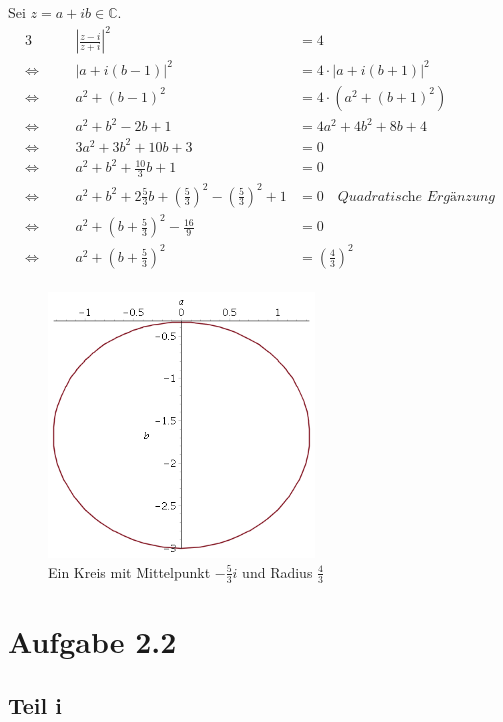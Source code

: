 \documentclass[10pt,a4paper]{article}
\begin{document}
Sei $z = a + ib \in \mathbb{C}$.
\begin{alignat*}{3}
&& \left| \frac{z - i}{z + i} \right|^{2} & = 4\\
\Leftrightarrow \quad && \left| a + i(b - 1) \right|^{2} & = 4 \cdot \left| a + i(b + 1) \right|^{2}\\
\Leftrightarrow \quad && a^{2} + (b - 1)^{2} & = 4 \cdot \left( a^{2} + (b + 1)^{2} \right)\\
\Leftrightarrow \quad && a^{2} + b^{2} - 2b + 1 & = 4a^{2} + 4b^{2} + 8b + 4\\
\Leftrightarrow \quad && 3a^{2} + 3b^{2} + 10b + 3 & = 0\\
\Leftrightarrow \quad && a^{2} + b^{2} + \frac{10}{3}b + 1 & = 0\\
\Leftrightarrow \quad && a^{2} + b^{2} + 2\frac{5}{3}b + \left( \frac{5}{3} \right)^{2} - \left( \frac{5}{3} \right)^{2} + 1 & = 0 \quad \textit{Quadratische Ergänzung}\\
\Leftrightarrow \quad && a^{2} + \left( b + \frac{5}{3} \right)^{2} - \frac{16}{9} & = 0\\
\Leftrightarrow \quad && a^{2} + \left( b + \frac{5}{3} \right)^{2} & = \left( \frac{4}{3} \right)^{2}\\
\end{alignat*}
\begin{figure}[h]
  \centering
  \includegraphics[width=200pt]{2_1_2}
  \caption{Ein Kreis mit Mittelpunkt $-\frac{5}{3}i$ und Radius $\frac{4}{3}$}
\end{figure}

\section{Aufgabe 2.2}

\subsection{Teil i}
\end{document}
